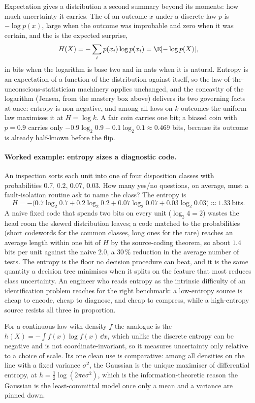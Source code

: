 Expectation gives a distribution a second summary beyond its moments: how
much uncertainty it carries. The  of an outcome $x$
under a discrete law $p$ is $-\log p(x)$, large when the outcome was
improbable and zero when it was certain, and the  is the expected surprise,
\[
H(X) = -\sum_{i} p(x_{i}) \log p(x_{i}) = \E[-\log p(X)],
\]
in bits when the logarithm is base two and in nats when it is natural.
Entropy is an expectation of a function of the distribution against
itself, so the law-of-the-unconscious-statistician machinery applies
unchanged, and the concavity of the logarithm (Jensen, from the mastery
box above) delivers its two governing facts at once: entropy is
non-negative, and among all laws on $k$ outcomes the uniform law
maximises it at $H = \log k$. A fair coin carries one bit; a biased coin
with $p = 0.9$ carries only $-0.9\log_{2}0.9 - 0.1\log_{2}0.1 \approx
0.469$ bits, because its outcome is already half-known before the flip.

\paragraph{Worked example: entropy sizes a diagnostic code.}
An inspection sorts each unit into one of four disposition classes with
probabilities $0.7$, $0.2$, $0.07$, $0.03$. How many yes/no questions,
on average, must a fault-isolation routine ask to name the class? The
entropy is
\[
H = -\big(0.7\log_{2}0.7 + 0.2\log_{2}0.2
+ 0.07\log_{2}0.07 + 0.03\log_{2}0.03\big) \approx 1.33\ \text{bits}.
\]
A naive fixed code that spends two bits on every unit ($\log_{2}4 = 2$)
wastes the head room the skewed distribution leaves; a code matched to
the probabilities (short codewords for the common classes, long ones for
the rare) reaches an average length within one bit of $H$ by the
source-coding theorem, so about $1.4$ bits per unit against the naive
$2.0$, a $30\,\%$ reduction in the average number of tests. The entropy
is the floor no decision procedure can beat, and it is the same quantity
a decision tree minimises when it splits on the feature that most reduces
class uncertainty. An engineer who reads entropy as the intrinsic
difficulty of an identification problem reaches for the right benchmark:
a low-entropy source is cheap to encode, cheap to diagnose, and cheap to
compress, while a high-entropy source resists all three in proportion.

For a continuous law with density $f$ the analogue is the
 $h(X) = -\int f(x)\log f(x)\,\dd x$, which
unlike the discrete entropy can be negative and is not
coordinate-invariant, so it measures uncertainty only relative to a
choice of scale. Its one clean use is comparative: among all densities on
the line with a fixed variance $\sigma^{2}$, the Gaussian is the unique
maximiser of differential entropy, at $h = \tfrac12\log(2\pi e
\sigma^{2})$, which is the information-theoretic reason the Gaussian is
the least-committal model once only a mean and a variance are pinned
down.

